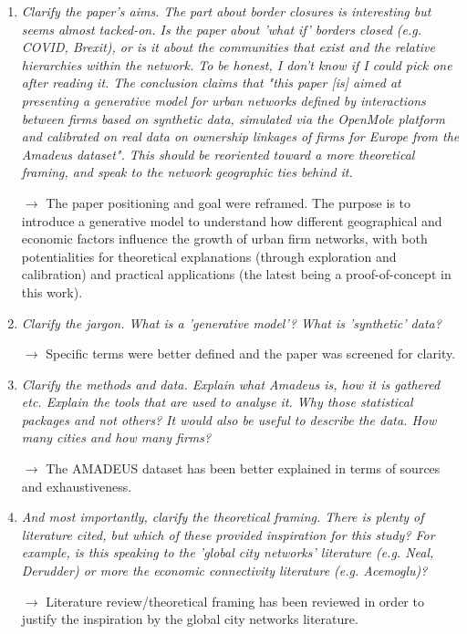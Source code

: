 \documentclass[10pt,a4paper,sans]{moderncv}
\begin{document}
\begin{enumerate}
	

	\item \textit{Clarify the paper's aims. The part about border closures is interesting but seems almost tacked-on. Is the paper about 'what if' borders closed (e.g. COVID, Brexit), or is it about the communities that exist and the relative hierarchies within the network. To be honest, I don't know if I could pick one after reading it. The conclusion claims that "this paper [is] aimed at presenting a generative model for urban networks defined by interactions between firms based on synthetic data, simulated via the OpenMole platform and calibrated on real data on ownership linkages of firms for Europe from the Amadeus dataset". This should be reoriented toward a more theoretical framing, and speak to the network geographic ties behind it.}
	
	$\rightarrow$ The paper positioning and goal were reframed. The purpose is to introduce a generative model to understand how different geographical and economic factors influence the growth of urban firm networks, with both potentialities for theoretical explanations (through exploration and calibration) and practical applications (the latest being a proof-of-concept in this work).
	
	\medskip

	\item \textit{Clarify the jargon. What is a 'generative model'? What is 'synthetic' data?}

	$\rightarrow$ Specific terms were better defined and the paper was screened for clarity.
	
	\medskip

	\item \textit{Clarify the methods and data. Explain what Amadeus is, how it is gathered etc. Explain the tools that are used to analyse it. Why those statistical packages and not others? It would also be useful to describe the data. How many cities and how many firms?}
	
	$\rightarrow$ The AMADEUS dataset has been better explained in terms of sources and exhaustiveness.
	
	\medskip

	\item \textit{And most importantly, clarify the theoretical framing. There is plenty of literature cited, but which of these provided inspiration for this study? For example, is this speaking to the 'global city networks' literature (e.g. Neal, Derudder) or more the economic connectivity literature (e.g. Acemoglu)?}
	 
	$\rightarrow$ Literature review/theoretical framing has been reviewed in order to justify the inspiration by the global city networks literature.
	
	\medskip


\end{enumerate}
\end{document}
